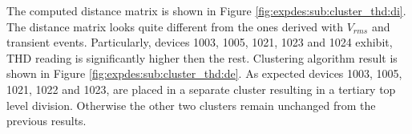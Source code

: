 The computed distance matrix is shown in Figure \ref{fig:expdes:sub:cluster_thd:di}.
The distance matrix looks quite different from the ones derived with $V_{rms}$ and transient events.
Particularly, devices 1003, 1005, 1021, 1023 and 1024 exhibit, THD reading is significantly higher then the rest.
Clustering algorithm result is shown in Figure \ref{fig:expdes:sub:cluster_thd:de}.
As expected devices 1003, 1005, 1021, 1022 and 1023, are placed in a separate cluster resulting in a tertiary top level division.
Otherwise the other two clusters remain unchanged from the previous results.
%

